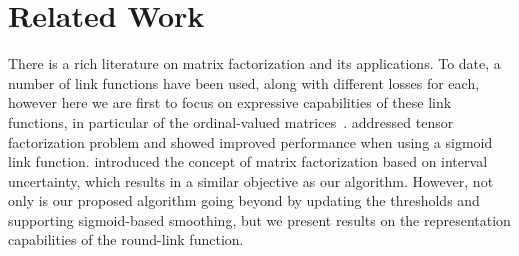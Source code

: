 \documentclass{article}
\newcommand{\sameer}[1]{\todo[color=blue!20]{\textbf{s:} #1}{}}
\begin{document}





\section{Related Work}
\label{sec:related}

There is a rich literature on matrix factorization and its applications. 
To date, a number of link functions have been used, along with different losses for each, however here we are first to focus on expressive capabilities of these link functions, in particular of the ordinal-valued matrices~\citep{singh08:a-unified,koren2011ordrec,paquet2012hierarchical,udell14:generalized}.
\citet{nickel13:logistic} addressed tensor factorization problem and showed improved performance when using a sigmoid link function. 
\citet{marevcek2017matrix} introduced the concept of matrix factorization based on interval uncertainty, which results in a similar objective as our algorithm. 
However, not only is our proposed algorithm going beyond by updating the thresholds and supporting sigmoid-based smoothing, but we present results on the representation capabilities of the round-link function. %
\end{document}
